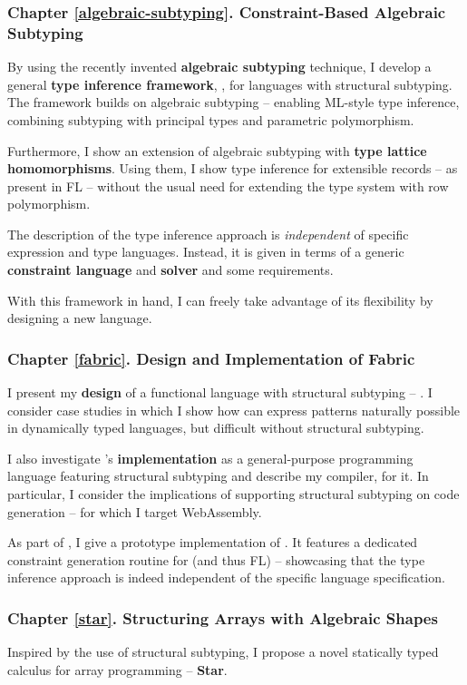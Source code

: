\subsubsection{Chapter \ref{algebraic-subtyping}. Constraint-Based Algebraic Subtyping}

By using the recently invented \textbf{algebraic subtyping} technique, I develop a general \textbf{type inference framework}, \inference{}, for languages with structural subtyping. 
The framework builds on algebraic subtyping -- enabling ML-style type inference, combining subtyping with principal types and parametric polymorphism. 

Furthermore, I show an extension of algebraic subtyping with \textbf{type lattice homomorphisms}. Using them, I show type inference for extensible records -- as present in FL -- without the usual need for extending the type system with row polymorphism.

The description of the type inference approach is \emph{independent} of specific expression and type languages. Instead, it is given in terms of a generic \textbf{constraint language} and \textbf{solver} and some requirements. 

With this framework in hand, I can freely take advantage of its flexibility by designing a new language.

\subsubsection{Chapter \ref{fabric}. Design and Implementation of Fabric}
I present my \textbf{design} of a functional language with structural subtyping -- \textbf{\fabric{}}. 
I consider case studies in which I show how \fabric{} can express patterns naturally possible in dynamically typed languages, but difficult without structural subtyping. 

I also investigate \fabric{}'s \textbf{implementation} as a general-purpose programming language featuring structural subtyping and describe my compiler, \compiler{} for it. In particular, I consider the implications of supporting structural subtyping on code generation -- for which I target WebAssembly.

As part of \compiler{}, I give a prototype implementation of \inference{}. It features a dedicated constraint generation routine for \fabric{} (and thus FL) -- showcasing that the type inference approach is indeed independent of the specific language specification.

\subsubsection{Chapter \ref{star}. Structuring Arrays with Algebraic Shapes}
Inspired by the use of structural subtyping, I propose a novel statically typed calculus for array programming -- \textbf{Star}. 

